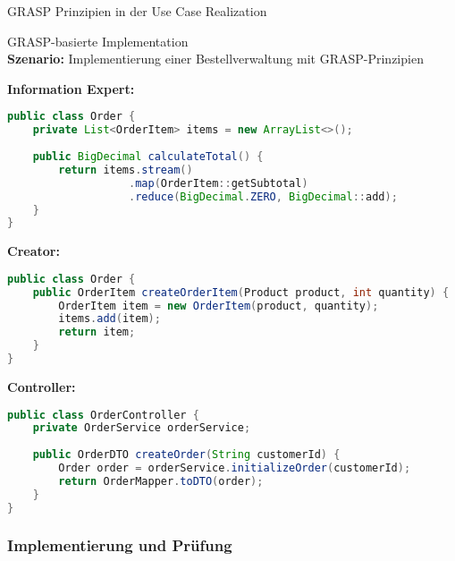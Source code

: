 \begin{KR}{GRASP Prinzipien in der Use Case Realization}
\end{KR}

\begin{example2}{GRASP-basierte Implementation}\\
\textbf{Szenario:} Implementierung einer Bestellverwaltung mit GRASP-Prinzipien

\textbf{Information Expert:}
\begin{lstlisting}[language=Java, style=basesmol]
public class Order {
    private List<OrderItem> items = new ArrayList<>();
    
    public BigDecimal calculateTotal() {
        return items.stream()
                   .map(OrderItem::getSubtotal)
                   .reduce(BigDecimal.ZERO, BigDecimal::add);
    }
}
\end{lstlisting}

\textbf{Creator:}
\begin{lstlisting}[language=Java, style=basesmol]
public class Order {
    public OrderItem createOrderItem(Product product, int quantity) {
        OrderItem item = new OrderItem(product, quantity);
        items.add(item);
        return item;
    }
}
\end{lstlisting}

\textbf{Controller:}
\begin{lstlisting}[language=Java, style=basesmol]
public class OrderController {
    private OrderService orderService;
    
    public OrderDTO createOrder(String customerId) {
        Order order = orderService.initializeOrder(customerId);
        return OrderMapper.toDTO(order);
    }
}
\end{lstlisting}
\end{example2}

\subsubsection{Implementierung und Prüfung}

